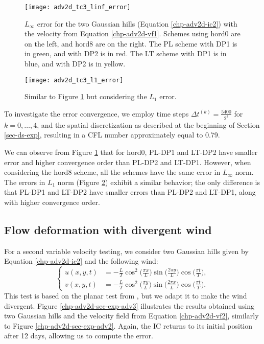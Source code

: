 \begin{figure}[!htb]
\centering
\texttt{[image: adv2d\_tc3\_linf\_error]}
\caption{$L_{\infty}$ error for the two Gaussian hills (Equation \ref{chp-adv2d-ic2})
with the velocity from Equation \eqref{chp-adv2d-vf1}.
Schemes using hord0 are on the left, and hord8 are on the right.
The PL scheme with DP1 is in green, and with DP2 is in red. 
The LT scheme with DP1 is in blue, and with DP2 is in yellow.
\label{chp-adv2d-sec-exp-adv2-error-linf}}
\end{figure}
\begin{figure}[!htb]
\centering
\texttt{[image: adv2d\_tc3\_l1\_error]}
\caption{Similar to Figure \ref{chp-adv2d-sec-exp-adv2-error-linf} but considering the $L_1$ error.
\label{chp-adv2d-sec-exp-adv2-error-l1}}
\end{figure}

To investigate the error convergence, we employ time steps $\Delta t^{(k)}=\frac{5400}{2^{k}}$ for 
$k = 0, \ldots, 4$, and the spatial discretization as described at the beginning of Section \ref{sec-ds-exp},
resulting in a CFL number approximately equal to 0.79.

We can observe from Figure \ref{chp-adv2d-sec-exp-adv2-error-linf} that for hord0, PL-DP1 and LT-DP2 have smaller
error and higher convergence order than PL-DP2 and LT-DP1.
However, when considering the hord8 scheme, all the schemes have the same error in $L_{\infty}$ norm.
The errors in $L_{1}$ norm (Figure \ref{chp-adv2d-sec-exp-adv2-error-l1}) exhibit a similar behavior; the only difference is 
that PL-DP1 and LT-DP2 have smaller errors than PL-DP2 and LT-DP1, along with higher convergence order.

\subsection{Flow deformation with divergent wind}
For a second variable velocity testing, we consider two Gaussian hills given by Equation 
\eqref{chp-adv2d-ic2} and the following wind:
\begin{equation}
	\label{chp-adv2d-vf2}
	\begin{cases}
		u(x,y,t) &= -\frac{L}{T} \cos^2\big(\frac{\pi x}{L}\big) \sin\big(\frac{2\pi y}{L}\big) \cos\big(\frac{\pi t}{T}\big), \\
		v(x,y,t) &= -\frac{L}{T} \cos^2\big(\frac{\pi y}{L}\big) \sin\big(\frac{2\pi x}{L}\big) \cos\big(\frac{\pi t}{T}\big).
	\end{cases}
\end{equation}
This test is based on the planar test from \citet{nair:2010}, but we adapt it to make the wind divergent.
Figure \ref{chp-adv2d-sec-exp-adv3} illustrates the results obtained using two Gaussian hills and the velocity field 
from Equation \eqref{chp-adv2d-vf2}, similarly to Figure  \ref{chp-adv2d-sec-exp-adv2}.
Again, the IC returns to its initial position after 12 days, allowing us to compute the error.

